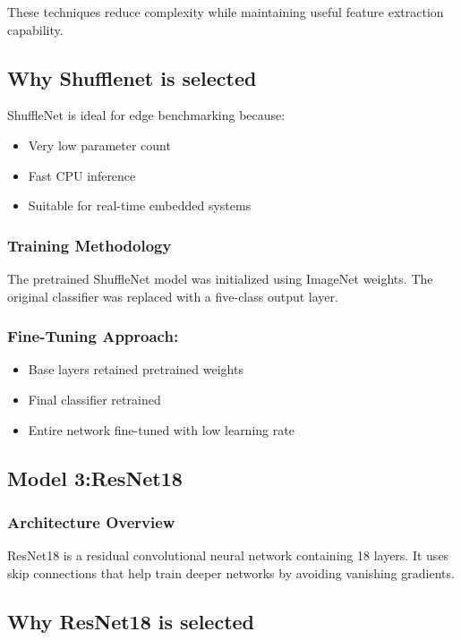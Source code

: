 These techniques reduce complexity while maintaining useful feature extraction capability.

\subsection{Why Shufflenet is selected}

ShuffleNet is ideal for edge benchmarking because:
\begin{itemize}
\item Very low parameter count
\item Fast CPU inference
\item Suitable for real-time embedded systems
\end{itemize}

\subsubsection{Training Methodology}

The pretrained ShuffleNet model was initialized using ImageNet weights. The original classifier was replaced with a five-class output layer.

\subsubsection{Fine-Tuning Approach:}
\begin{itemize}
\item Base layers retained pretrained weights
\item Final classifier retrained
\item Entire network fine-tuned with low learning rate
\end{itemize}

\subsection{Model 3:ResNet18 }
\subsubsection{Architecture Overview}

ResNet18 is a residual convolutional neural network containing 18 layers. It uses skip connections that help train deeper networks by avoiding vanishing gradients.

\subsection{Why ResNet18 is selected}

